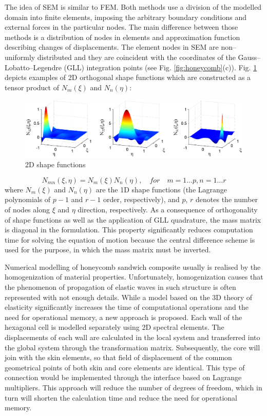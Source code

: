 \documentclass[a4paper,12pt]{article}
\begin{document}
The idea of SEM is similar to FEM. Both methods use a division of the modelled domain into finite elements, imposing the arbitrary boundary conditions and external forces in the particular nodes. The main difference between those methods is a distribution of nodes in elements and approximation function describing changes of displacements. The element nodes in SEM are non--uniformly distributed and they are coincident with the coordinates of the Gauss--Lobatto--Legendre (GLL) integration points (see Fig. \ref{fig:honeycomb}(c)).
Fig. \ref{fig:shape_function} depicts examples of 2D orthogonal shape functions which are constructed as a tensor product of $N_m(\xi)$ and $N_n(\eta)$:
\begin{figure}
\includegraphics[width=1\textwidth]{../Figures/shape_function.eps}
	\caption{2D shape functions}
	\label{fig:shape_function}
\end{figure}
\begin{equation}
N_{mn}(\xi,\eta)=N_m(\xi)N_n(\eta),\quad for \quad m=1\dots p,n=1\dots r
\label{eq:shape}
\end{equation} 
where $N_m(\xi)$ and $N_n(\eta)$ are the 1D shape functions (the Lagrange polynomials of $p-1$ and $r-1$ order, respectively), and $p$, $r$ denotes the number of nodes along $\xi$ and $\eta$ direction, respectively. As a consequence of orthogonality of shape functions as well as the application of GLL quadrature, the mass matrix is diagonal in the formulation. This property significantly reduces computation time for solving the equation of motion because the central difference scheme is used for the purpose, in which the mass matrix must be inverted.

Numerical modelling of honeycomb sandwich composite usually is realised by the homogenization of material properties. Unfortunately, homogenization causes that the phenomenon of propagation of elastic waves in such structure is often represented with not enough details. While a model based on the 3D theory of elasticity significantly increases the time of computational operations and the need for operational memory, a new approach is proposed. Each wall of the hexagonal cell is modelled separately using 2D spectral elements. The displacements of each wall are calculated in the local system and transferred into the global system through the transformation matrix. Subsequently, the core will join with the skin elements, so that field of displacement of the common geometrical points of both skin and core elements are identical. This type of connection would be implemented through the interface based on Lagrange multipliers. This approach will reduce the number of degrees of freedom, which in turn will shorten the calculation time and reduce the need for operational memory.
\end{document}

